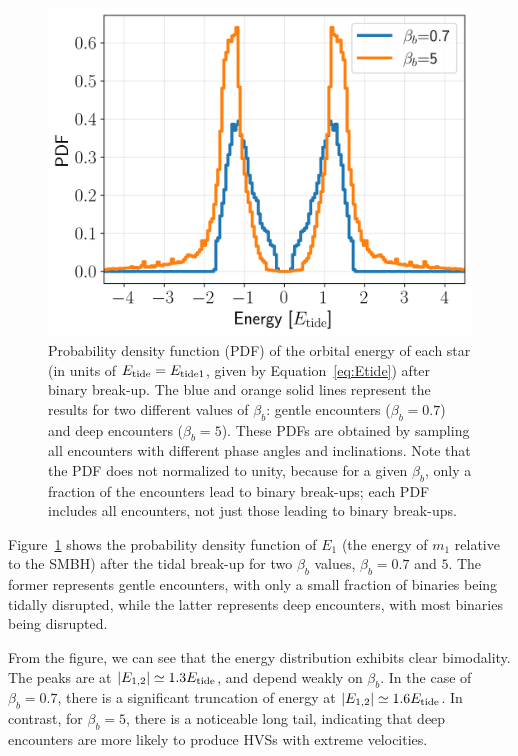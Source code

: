 \documentclass[twocolumn]{aastex631}
\begin{document}
\begin{figure}[htbp]
\centering
\includegraphics[width=1.02\columnwidth]{figures/Hills_Edistribution.png}
\caption{
Probability density function (PDF) of the orbital energy of each star (in units of $E_{\rm tide}=E_{\rm tide1}$, given by Equation~\ref{eq:Etide}) after binary break-up.
The blue and orange solid lines represent the results for two different values of $\beta_b$: gentle encounters ($\beta_b=0.7$) and deep encounters ($\beta_b=5$). 
These PDFs are obtained by sampling all encounters with different phase angles and inclinations.
Note that the PDF does not normalized to unity, because for a given $\beta_b$, only a fraction of the encounters lead to binary break-ups; 
each PDF includes all encounters, not just those leading to binary break-ups.}
\label{Fig:Hills_Edistribution}
\end{figure}

Figure~\ref{Fig:Hills_Edistribution} shows the probability density function of $E_1$ (the energy of $m_1$ relative to the SMBH) after the tidal break-up for two $\beta_b$ values, $\beta_b=0.7$ and $5$. 
The former represents gentle encounters, with only a small fraction of binaries being tidally disrupted, while the latter represents deep encounters, with most binaries being disrupted. 


From the figure, we can see that the energy distribution exhibits clear bimodality. 
The peaks are at $|E_{1,2}|\simeq 1.3 E_{\rm tide}$, and depend weakly on $\beta_b$.
In the case of $\beta_b=0.7$, there is a significant truncation of energy at $|E_{1,2}|\simeq 1.6E_{\rm tide}$. 
In contrast, for $\beta_b=5$, there is a noticeable long tail, indicating that deep encounters are more likely to produce HVSs with extreme velocities.
\end{document}
